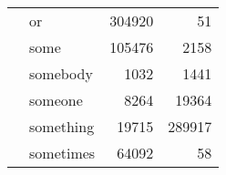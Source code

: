 \begin{longtable}[ht]{llrr}
 & or & {\cellcolor[HTML]{F0F9B7}} \color[HTML]{000000} 304920 & {\cellcolor[HTML]{FFFFD9}} \color[HTML]{000000} 51 \\
 & some & {\cellcolor[HTML]{FAFDCE}} \color[HTML]{000000} 105476 & {\cellcolor[HTML]{FEFFD8}} \color[HTML]{000000} 2158 \\
 & somebody & {\cellcolor[HTML]{FFFFD9}} \color[HTML]{000000} 1032 & {\cellcolor[HTML]{FEFFD8}} \color[HTML]{000000} 1441 \\
 & someone & {\cellcolor[HTML]{FFFFD9}} \color[HTML]{000000} 8264 & {\cellcolor[HTML]{F5FBC4}} \color[HTML]{000000} 19364 \\
 & something & {\cellcolor[HTML]{FEFFD8}} \color[HTML]{000000} 19715 & {\cellcolor[HTML]{081D58}} \color[HTML]{F1F1F1} 289917 \\
 & sometimes & {\cellcolor[HTML]{FCFED3}} \color[HTML]{000000} 64092 & {\cellcolor[HTML]{FFFFD9}} \color[HTML]{000000} 58 \\
\cline{1-4}
\end{longtable}
